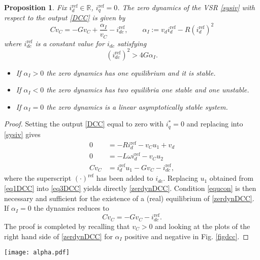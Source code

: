 \documentclass[5p,twocolumn]{elsarticle}
\def\rea{\mathbb{R}}
\def\begequ{\begin{equation}}
\def\endequ{\end{equation}}
\def\lab{\label}
\def\begite{\begin{itemize}}
\def\endite{\end{itemize}}
\newtheorem{proposition}[theorem]{Proposition}
\numberwithin{equation}{section}
\begin{document}
\begin{proposition}\em
\label{zeroprop1}
Fix $i_d^{\mathrm{ref}} \in \rea$, $i_q^{\mathrm{ref}}=0$. The zero dynamics of the VSR \eqref{sysiv} with respect to the output \eqref{DCC} is given by
\begin{equation}
\lab{zerdynDCC}
C \dot v_C=-G v_C+\frac{\alpha_I}{v_C} - i_{dc}^{\mathrm{ref}},\qquad \alpha_I:=v_di_d^{\mathrm{ref}}-R(i_d^{\mathrm{ref}})^2
\end{equation}
where $i_{dc}^{\mathrm{ref}}$ is a constant value for $i_{dc}$ satisfying
\begequ
\lab{equcon}
(i_{dc}^{\mathrm{ref}})^2> 4 G \alpha_I.
\endequ
\begite
\item[-] If $\alpha_I>0$ the zero dynamics has one equilibrium and it is {\em stable}.
\item[-] If $\alpha_I<0$ the zero dynamics has two equilibria one stable and one {unstable}.
\item[-] If $\alpha_I=0$ the zero dynamics is a linear asymptotically {\em stable} system.
\endite
\end{proposition}
\begin{proof}
Setting the output \eqref{DCC} equal to zero with $i_q^*=0$ and replacing into \eqref{sysiv} gives
\begin{align}
0&=-Ri_d^{\mathrm{ref}} -v_C u_1 +v_d\label{eq1DCC}\\
0&=-L\omega i_d^{\mathrm{ref}} -v_C u_2 \label{eq2DCC}\\
C\dot v_C&=i_d^{\mathrm{ref}}u_1 -Gv_C-i_{dc}^{\mathrm{ref}}\label{eq3DCC},
\end{align}
where the superscript $(\cdot)^{\mathrm{ref}}$ has been added to $i_{dc}$. Replacing $u_1$ obtained from \eqref{eq1DCC} into \eqref{eq3DCC} yields directly \eqref{zerdynDCC}. Condition \eqref{equcon} is then
necessary and sufficient for the existence of a (real) equilibrium of \eqref{zerdynDCC}. If $\alpha_I=0$ the dynamics reduces to $$C \dot v_C=-G v_C- i_{dc}^{\mathrm{ref}}.$$ The proof is completed by recalling that $v_C>0$ and looking at
the plots of  the right hand side of \eqref{zerdynDCC} for $\alpha_I$ positive and negative in Fig. \ref{figdcc}.
\end{proof}
\begin{figure*}[ht]
 \centering
\texttt{[image: alpha.pdf]}
 \caption{Plot of $\dot v_C$ versus $v_C$ for the cases of (a) $\alpha_I>0$ and (b) $\alpha_I<0$. The arrows in the horizontal axis indicate the direction of the flow of the zero dynamics.}
 \label{figdcc}
\end{figure*}
\end{document}
